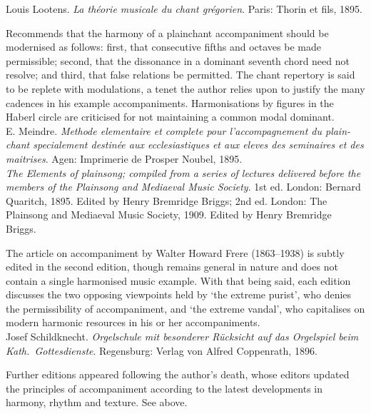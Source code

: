     \parindent=0pt
    \hangindent=0pt
  Louis Lootens. \emph{La théorie musicale du chant grégorien}. Paris:  Thorin et fils, 1895.

     \parindent=20pt
     \hangindent=20pt
     Recommends that the harmony of a plainchant accompaniment should be modernised as follows: first, that consecutive fifths and octaves be made permissible; second, that the dissonance in a dominant seventh chord need not resolve; and third, that false relations be permitted. The chant repertory is said to be replete with modulations, a tenet the author relies upon to justify the many cadences in his example accompaniments. Harmonisations by figures in the Haberl circle are criticised for not maintaining a common modal dominant.\\

    \parindent=0pt
    \hangindent=0pt
  \covid{}E. Meindre. \emph{Methode elementaire et complete pour l'accompagnement du plain-chant specialement destinée aux ecclesiastiques et aux eleves des seminaires et des maitrises}. Agen:  Imprimerie de Prosper Noubel, 1895. \\

    \parindent=0pt
    \hangindent=0pt
  \emph{The Elements of plainsong; compiled from a series of lectures delivered before the members of the Plainsong and Mediaeval Music Society}. 1st ed. London:  Bernard Quaritch, 1895. Edited by Henry Bremridge Briggs;  2nd ed. London:  The Plainsong and Mediaeval Music Society, 1909. Edited by Henry Bremridge Briggs.

     \parindent=20pt
     \hangindent=20pt
     The article on accompaniment by Walter Howard Frere (1863--1938) is subtly edited in the second edition, though remains general in nature and does not contain a single harmonised music example. With that being said, each edition discusses the two opposing viewpoints held by `the extreme purist', who denies the permissibility of accompaniment, and `the extreme vandal', who capitalises on modern harmonic resources in his or her accompaniments. \\

    \parindent=0pt
    \hangindent=0pt
  Josef Schildknecht. \emph{Orgelschule mit besonderer Rücksicht auf das Orgelspiel beim Kath.\ Gottesdienste}. Regensburg:  Verlag von Alfred Coppenrath, 1896.

     \parindent=20pt
     \hangindent=20pt
     Further editions appeared following the author's death, whose editors updated the principles of accompaniment according to the latest developments in harmony, rhythm and texture. See  above.\\

